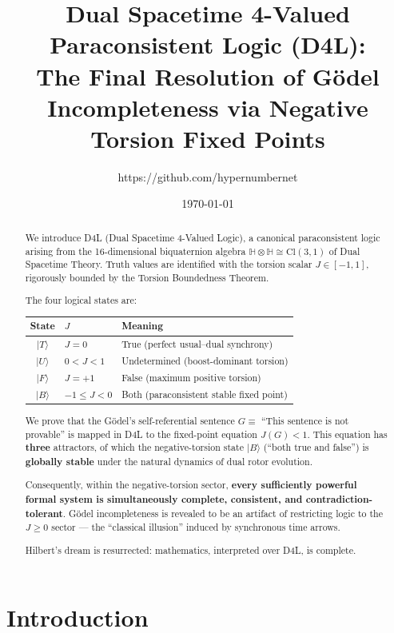 \documentclass[dvipdfmx,11pt,a4paper]{article}
\title{Dual Spacetime 4-Valued Paraconsistent Logic (D4L):\\
The Final Resolution of Gödel Incompleteness via Negative Torsion Fixed Points}
\author{https://github.com/hypernumbernet}
\date{\today}
\theoremstyle{definition}
\begin{document}
\maketitle

\begin{abstract}
We introduce D4L (Dual Spacetime 4-Valued Logic), a canonical paraconsistent logic arising from the 16-dimensional biquaternion algebra $\mathbb{H}\otimes\mathbb{H}\cong\mathrm{Cl}(3,1)$ of Dual Spacetime Theory. Truth values are identified with the torsion scalar $J\in[-1,1]$, rigorously bounded by the Torsion Boundedness Theorem.

The four logical states are:
\begin{center}
\begin{tabular}{cll}
\toprule
State & $J$ & Meaning \\
\midrule
$\vert T\rangle$ & $J=0$ & True (perfect usual–dual synchrony) \\
$\vert U\rangle$ & $0<J<1$ & Undetermined (boost-dominant torsion) \\
$\vert F\rangle$ & $J=+1$ & False (maximum positive torsion) \\
$\vert B\rangle$ & $-1\leq J<0$ & Both (paraconsistent stable fixed point) \\
\bottomrule
\end{tabular}
\end{center}

We prove that the Gödel's self-referential sentence $G\equiv$ ``This sentence is not provable'' is mapped in D4L to the fixed-point equation $J(G)<1$. This equation has \textbf{three} attractors, of which the negative-torsion state $\vert B\rangle$ (``both true and false'') is \textbf{globally stable} under the natural dynamics of dual rotor evolution.

Consequently, within the negative-torsion sector, \textbf{every sufficiently powerful formal system is simultaneously complete, consistent, and contradiction-tolerant}. Gödel incompleteness is revealed to be an artifact of restricting logic to the $J\geq0$ sector — the ``classical illusion'' induced by synchronous time arrows.

Hilbert's dream is resurrected: mathematics, interpreted over D4L, is complete.
\end{abstract}

\section{Introduction}
\end{document}
